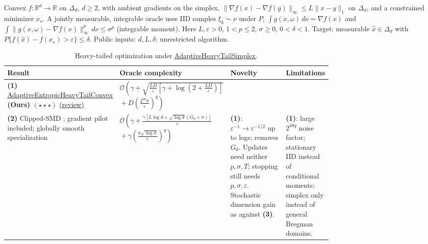 \begin{table}[tp]
\centering
\caption{Heavy-tailed optimization under \href{https://github.com/k3nfalt/longtails/blob/main/LongTails/Setups/AdaptiveHeavyTailSimplex.lean}{AdaptiveHeavyTailSimplex}.}\label{tab:AdaptiveHeavyTailSimplex}
\parbox{\linewidth}{\footnotesize Convex $f:\mathbb R^d\to\mathbb R$ on $\Delta_d$, $d\ge2$, with ambient gradients on the simplex, $\|\nabla f(x)-\nabla f(y)\|_\infty\le L\|x-y\|_1$ on $\Delta_d$, and a constrained minimizer $x_\star$. A jointly measurable, integrable oracle uses IID samples $\xi_k\sim\nu$ under $P$, $\int g(x,\omega)\,d\nu=\nabla f(x)$ and $\int\|g(x,\omega)-\nabla f(x)\|_\infty^p\,d\nu\le\sigma^p$ (integrable moment). Here $L,\varepsilon>0$, $1<p\le2$, $\sigma\ge0$, $0<\delta<1$. Target: measurable $\widehat x\in\Delta_d$ with $P\{f(\widehat x)-f(x_\star)>\varepsilon\}\le\delta$. Public inputs: $d,L,\delta$; unrestricted algorithm.}\par\smallskip
\begin{threeparttable}
\footnotesize
\setlength{\tabcolsep}{4pt}\renewcommand{\arraystretch}{1.20}
\begin{tabularx}{\linewidth}{@{}>{\raggedright\arraybackslash}p{0.18\linewidth}>{\raggedright\arraybackslash}p{0.32\linewidth}>{\raggedright\arraybackslash}p{0.27\linewidth}>{\raggedright\arraybackslash}X@{}}
\toprule
\textbf{Result} & \textbf{Oracle complexity} & \textbf{Novelty} & \textbf{Limitations} \\
\midrule
\textbf{(1)} \href{https://github.com/k3nfalt/longtails/blob/main/LongTails/Theorems/AdaptiveEntropicHeavyTailConvex.lean}{Adaptive\allowbreak Entropic\allowbreak Heavy\allowbreak Tail\allowbreak Convex} \textbf{(Ours)} $(\star\star\star)$ \href{https://github.com/k3nfalt/longtails/blob/main/scripts/reviews/AdaptiveEntropicHeavyTailConvex.md}{(review)} & $\displaystyle\mathcal{O}\!\left(\gamma+\sqrt{\frac{LD}{\varepsilon}\left[\gamma+\log\!\left(2+\frac{LD}{\varepsilon}\right)\right]}\right.$\newline $\displaystyle\left.{}+D\left(\frac{2^{38}\sigma}{\varepsilon}\right)^q\right)$ &  &  \\
\midrule[1.2pt]
\textbf{(2)} Clipped-SMD \citep[Thm.~3.1, known horizon]{nguyen2023heavyv2}; gradient pilot included; globally smooth specialization & $\displaystyle\mathcal{O}\!\left(\gamma+\frac{\gamma[L\log d+\sqrt{\log d}(G_0+\sigma)]}{\varepsilon}\right.$\newline $\displaystyle\left.{}+\gamma\left(\frac{\sigma\sqrt{\log d}}{\varepsilon}\right)^q\right)$ & \textbf{(1)}: $\varepsilon^{-1}\to\varepsilon^{-1/2}$ up to logs; removes $G_0$. Updates need neither $p,\sigma,T$; stopping still needs $p,\sigma,\varepsilon$. Stochastic dimension gain as against \textbf{(3)}. & \textbf{(1)}: large $2^{38q}$ noise factor; stationary IID instead of conditional moments; simplex only instead of general Bregman domains. \\

\end{tabularx}
\end{threeparttable}
\end{table}
